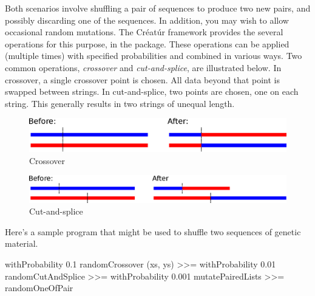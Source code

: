 \documentclass[a4paper,10pt]{report}
\begin{document}
Both scenarios involve shuffling a pair of sequences to produce two new
pairs, and possibly discarding one of the sequences.
In addition, you may wish to allow occasional random mutations.
The Créatúr framework provides the 
several operations for this purpose, in the
 package.
These operations can be applied (multiple times)
with specified probabilities
and combined in various ways.
Two common operations, \emph{crossover} and \emph{cut-and-splice},
are illustrated below.
In crossover, a single crossover point is chosen.
All data beyond that point is swapped between strings.
In cut-and-splice, two points are chosen, one on each string.
This generally results in two strings of unequal length.

\begin{figure}[hbtp]
 \centering
 \includegraphics[scale=0.7,keepaspectratio=true]{./images/crossover.eps}
  \caption{Crossover}
  \label{fig:crossover}
\end{figure}

\begin{figure}[hbtp]
 \centering
 \includegraphics[scale=0.7,keepaspectratio=true]{./images/cut-and-splice.eps}
  \caption{Cut-and-splice}
  \label{fig:cut-and-splice}
\end{figure}

Here's a sample program that might be used to shuffle two
sequences of genetic material.

\label{code:recombination}
\begin{code}
    withProbability 0.1 randomCrossover (xs, ys) >>=
    withProbability 0.01 randomCutAndSplice >>=
    withProbability 0.001 mutatePairedLists >>=
    randomOneOfPair
\end{code} 
\end{document}
